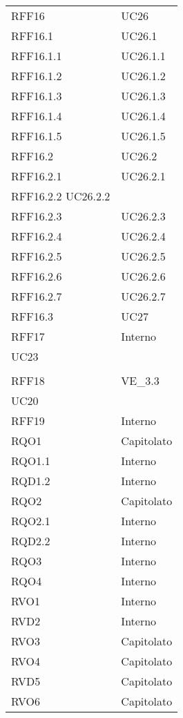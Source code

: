 \begin{longtable}{ >{\centering}p{}
		>{\centering}p{}}
\tabularnewline
RFF16 & UC26 
\tabularnewline
RFF16.1 & UC26.1
\tabularnewline
RFF16.1.1 & UC26.1.1
\tabularnewline
RFF16.1.2 & UC26.1.2
\tabularnewline
RFF16.1.3 & UC26.1.3
\tabularnewline
RFF16.1.4 & UC26.1.4
\tabularnewline
RFF16.1.5 & UC26.1.5
\tabularnewline
RFF16.2 & UC26.2
\tabularnewline
RFF16.2.1 & UC26.2.1
\tabularnewline
RFF16.2.2 UC26.2.2
\tabularnewline
RFF16.2.3 & UC26.2.3
\tabularnewline
RFF16.2.4 & UC26.2.4
\tabularnewline
RFF16.2.5 & UC26.2.5
\tabularnewline
RFF16.2.6 & UC26.2.6
\tabularnewline
RFF16.2.7 & UC26.2.7
\tabularnewline
RFF16.3 & UC27
\tabularnewline
RFF17 &	Interno\\
UC23\\ 	\tabularnewline
RFF18 &	VE\_3.3\\
UC20   	\tabularnewline
RFF19 &	Interno \tabularnewline
RQO1	&	Capitolato \tabularnewline
RQO1.1	&	Interno \tabularnewline
RQD1.2	&	Interno \tabularnewline
RQO2	&	Capitolato \tabularnewline
RQO2.1	&	Interno \tabularnewline
RQD2.2	&	Interno \tabularnewline
RQO3	&	Interno \tabularnewline
RQO4	&	Interno \tabularnewline
RVO1	&	Interno \tabularnewline
RVD2	&	Interno \tabularnewline
RVO3	&	Capitolato \tabularnewline
RVO4	&	Capitolato \tabularnewline
RVD5	&	Capitolato \tabularnewline
RVO6	&	Capitolato \tabularnewline
		
\end{longtable}



